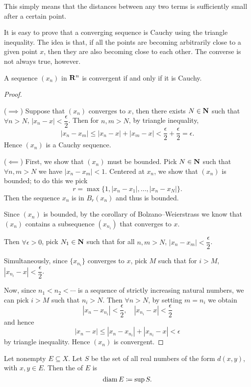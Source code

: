 \begin{remark}
This simply means that the distances between any two terms is sufficiently small after a certain point.
\end{remark}

It is easy to prove that a converging sequence is Cauchy using the triangle inequality. The idea is that, if all the points are becoming arbitrarily close to a given point $x$, then they are also becoming close to each other. The converse is not always true, however.

\begin{proposition}
A sequence $(x_n)$ in $\mathbf R^n$ is convergent if and only if it is Cauchy.
\end{proposition}

\begin{proof} \

($\implies$) Suppose that $(x_n)$ converges to $x$, then there exists $N\in\mathbf N$ such that $\forall n>N$, $|x_n-x|<\dfrac{\epsilon}{2}$. Then for $n,m>N$, by triangle inequality,
\[|x_n-x_m|\le|x_n-x|+|x_m-x|<\frac{\epsilon}{2}+\frac{\epsilon}{2}=\epsilon.\]
Hence $(x_n)$ is a Cauchy sequence.

($\impliedby$) First, we show that $(x_n)$ must be bounded. 
Pick $N\in\mathbf N$ such that $\forall n,m>N$ we have $|x_n-x_m|<1$. 
Centered at $x_n$, we show that $(x_n)$ is bounded; to do this we pick
\[r=\max\{1,|x_n-x_1|,\dots,|x_n-x_N|\}.\]
Then the sequence ${x_n}$ is in $B_r(x_n)$ and thus is bounded.

Since $(x_n)$ is bounded, by the corollary of Bolzano--Weierstrass we know that $(x_n)$ contains a subsequence $(x_{n_i})$ that converges to $x$.

Then $\forall\epsilon>0$, pick $N_1\in\mathbf N$ such that for all $n,m>N$, $|x_n-x_m|<\dfrac{\epsilon}{2}$.

Simultaneously, since $\{x_{n_i}\}$ converges to $x$, pick $M$ such that for $i>M$, $|x_{n_i}-x|<\dfrac{\epsilon}{2}$.

Now, since $n_1<n_2<\cdots$ is a sequence of strictly increasing natural numbers, we can pick $i>M$ such that $n_i>N$. Then $\forall n>N$, by setting $m=n_i$ we obtain
\[ |x_n-x_{n_i}| < \frac{\epsilon}{2}, \quad |x_{n_i}-x| < \frac{\epsilon}{2} \]
and hence
\[|x_n-x|\le|x_n-x_{n_i}|+|x_{n_i}-x|<\epsilon\]
by triangle inequality. Hence $(x_n)$ is convergent.
\end{proof}

\begin{definition}
Let nonempty $E\subseteq X$. Let $S$ be the set of all real numbers of the form $d(x,y)$, with $x,y\in E$. Then the  of $E$ is 
\[ \operatorname{diam} E\coloneqq\sup S. \]

\end{definition}

